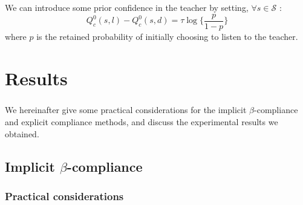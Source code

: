 \documentclass[a4paper]{report}
\begin{document}
{{{{			\paragraph{} We can introduce some prior confidence in the teacher by setting, $\forall s\in\mathcal{S}$ : 
			\begin{equation}
				Q^0_c(s,l) - Q^0_c(s,d) =\tau \log\{\frac{p}{1-p}\}
			\end{equation}
			where $p$ is the retained probability of initially choosing to listen to the teacher. 
			}
		}	
	}
	
	\chapter{Results}
	{
		\label{chap::res}
				\paragraph{} We hereinafter give some practical considerations for the implicit $\beta$-compliance and explicit compliance methods, and discuss the experimental results we obtained. 
		\section{Implicit $\beta$-compliance}
		{
			\subsection{Practical considerations}
			{
}}}}
\end{document}
